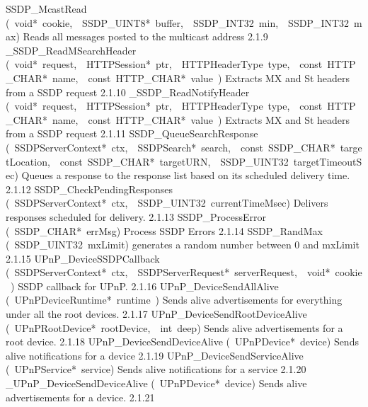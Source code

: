 \documentclass{article}
\begin{document}
\begin{cxxentry}
\begin{cxxentry}
\begin{cxxnames}
        {SSDP\_McastRead}
        {(\ void*\ cookie,\ \ SSDP\_UINT8*\ buffer,\ \ SSDP\_INT32\ min,\ \ SSDP\_INT32\ max)}
        {Reads all messages posted to the multicast address}
        {2.1.9}
        {\_SSDP\_ReadMSearchHeader}
        {(\ void*\ request,\ \ HTTPSession*\ ptr,\ \ HTTPHeaderType\ type,\ \ const\ HTTP\_CHAR*\ name,\ \ const\ HTTP\_CHAR*\ value\ )}
        {Extracts MX and St headers from a SSDP request}
        {2.1.10}
        {\_SSDP\_ReadNotifyHeader}
        {(\ void*\ request,\ \ HTTPSession*\ ptr,\ \ HTTPHeaderType\ type,\ \ const\ HTTP\_CHAR*\ name,\ \ const\ HTTP\_CHAR*\ value\ )}
        {Extracts MX and St headers from a SSDP request}
        {2.1.11}
        {SSDP\_QueueSearchResponse}
        {(\ SSDPServerContext*\ ctx,\ \ SSDPSearch*\ search,\ \ const\ SSDP\_CHAR*\ targetLocation,\ \ const\ SSDP\_CHAR*\ targetURN,\ \ SSDP\_UINT32\ targetTimeoutSec)}
        {Queues a response to the response list based on its scheduled delivery time.}
        {2.1.12}
        {SSDP\_CheckPendingResponses}
        {(\ SSDPServerContext*\ ctx,\ \ SSDP\_UINT32\ currentTimeMsec)}
        {Delivers responses scheduled for delivery. }
        {2.1.13}
        {SSDP\_ProcessError}
        {(\ SSDP\_CHAR*\ errMsg)}
        {Process SSDP Errors}
        {2.1.14}
        {SSDP\_RandMax}
        {(\ SSDP\_UINT32\ mxLimit)}
        {generates a random number between 0 and mxLimit}
        {2.1.15}
        {UPnP\_DeviceSSDPCallback}
        {(\ SSDPServerContext*\ ctx,\ \ SSDPServerRequest*\ serverRequest,\ \ void*\ cookie\ )}
        {SSDP callback for UPnP. }
        {2.1.16}
        {UPnP\_DeviceSendAllAlive}
        {(\ UPnPDeviceRuntime*\ runtime\ )}
        {Sends alive advertisements for everything under all the root devices. }
        {2.1.17}
        {UPnP\_DeviceSendRootDeviceAlive}
        {(\ UPnPRootDevice*\ rootDevice,\ \ int\ deep)}
        {Sends alive advertisements for a root device.}
        {2.1.18}
        {UPnP\_DeviceSendDeviceAlive}
        {(\ UPnPDevice*\ device)}
        {Sends alive notifications for a device}
        {2.1.19}
        {UPnP\_DeviceSendServiceAlive}
        {(\ UPnPService*\ service)}
        {Sends alive notifications for a service}
        {2.1.20}
        {\_UPnP\_DeviceSendDeviceAlive}
        {(\ UPnPDevice*\ device)}
        {Sends alive advertisements for a device.}
        {2.1.21}

\end{cxxnames}
\end{cxxentry}
\end{cxxentry}
\end{document}

